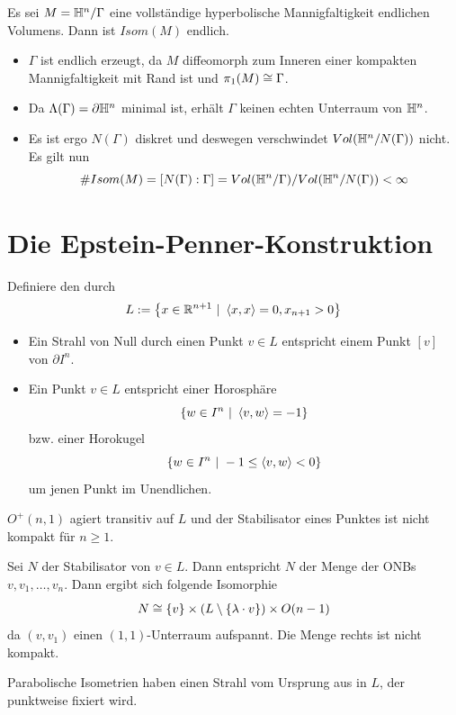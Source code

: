 \documentclass{book}
\begin{document}
\Kor{}
Es sei $M = \mathbb{H}^n / \Gamma$ eine vollständige hyperbolische Mannigfaltigkeit endlichen Volumens. Dann ist $Isom(M)$ endlich.
\begin{Beweis}{}
	\begin{itemize}
		\item $\Gamma$ ist endlich erzeugt, da $M$ diffeomorph zum Inneren einer kompakten Mannigfaltigkeit mit Rand ist und $\pi_1(M) \overset{}{\cong} \Gamma$.
		\item Da $\Lambda(\Gamma) = \partial \mathbb{H}^n$ minimal ist, erhält $\Gamma$ keinen echten Unterraum von $\mathbb{H}^n$.
		\item Es ist ergo $N(\Gamma)$ diskret und deswegen verschwindet $Vol(\mathbb{H}^n / N(\Gamma))$ nicht. Es gilt nun
		\[ \# Isom(M) = [N(\Gamma) : \Gamma] = Vol(\mathbb{H}^n /\Gamma) / Vol(\mathbb{H}^n / N(\Gamma)) < \infty \]
	\end{itemize}
\end{Beweis}

\section{Die Epstein-Penner-Konstruktion}
\Def{}
Definiere den  durch
\[ L := \set{x\in \R^{n+1}}{\shrp{x,x} = 0, x_{n+1} > 0} \]

\Bem{}
\begin{itemize}
	\item Ein Strahl von Null durch einen Punkt $v\in L$ entspricht einem Punkt $[v]$ von $\partial I^n$.
	\item Ein Punkt $v \in L$ entspricht einer Horosphäre
	\[ \set{w \in I^n}{ \shrp{v,w} = -1} \]
	bzw. einer Horokugel
	\[ \set{w \in I^n}{ -1\leq \shrp{v,w} < 0} \]
	um jenen Punkt im Unendlichen.
\end{itemize}

\Lem{}
$O^+(n,1)$ agiert transitiv auf $L$ und der Stabilisator eines Punktes ist nicht kompakt für $n \geq 1$.
\begin{Beweis}{}
	Sei $N$ der Stabilisator von $v\in L$. Dann entspricht $N$ der Menge der ONBs $v,v_1,\ldots, v_n$. Dann ergibt sich folgende Isomorphie
	\[ N \overset{}{\cong} \{v\} \times( L \setminus \{ \lambda \cdot v \}) \times O(n-1) \]
	da $(v,v_1)$ einen $(1,1)$-Unterraum aufspannt. Die Menge rechts ist nicht kompakt.
\end{Beweis}

\Bem{}
Parabolische Isometrien haben einen Strahl vom Ursprung aus in $L$, der punktweise fixiert wird.
\end{document}

